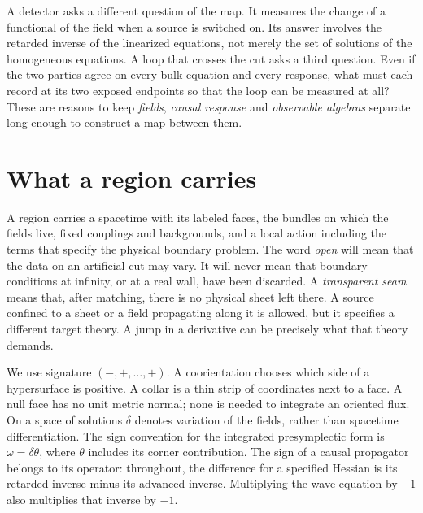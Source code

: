 A detector asks a different question of the map. It measures the change of a functional of the field when a source is switched on. Its answer involves the retarded inverse of the linearized equations, not merely the set of solutions of the homogeneous equations. A loop that crosses the cut asks a third question. Even if the two parties agree on every bulk equation and every response, what must each record at its two exposed endpoints so that the loop can be measured at all? These are reasons to keep \emph{fields}, \emph{causal response} and \emph{observable algebras} separate long enough to construct a map between them.

\section*{What a region carries}
A region carries a spacetime with its labeled faces, the bundles on which the fields live, fixed couplings and backgrounds, and a local action including the terms that specify the physical boundary problem. The word \emph{open} will mean that the data on an artificial cut may vary. It will never mean that boundary conditions at infinity, or at a real wall, have been discarded. A \emph{transparent seam} means that, after matching, there is no physical sheet left there. A source confined to a sheet or a field propagating along it is allowed, but it specifies a different target theory. A jump in a derivative can be precisely what that theory demands.

We use signature $(-,+,\ldots,+)$. A coorientation chooses which side of a hypersurface is positive. A collar is a thin strip of coordinates next to a face. A null face has no unit metric normal; none is needed to integrate an oriented flux. On a space of solutions $\delta$ denotes variation of the fields, rather than spacetime differentiation. The sign convention for the integrated presymplectic form is $\omega=\delta\theta$, where $\theta$ includes its corner contribution. The sign of a causal propagator belongs to its operator: throughout, the difference for a specified Hessian is its retarded inverse minus its advanced inverse. Multiplying the wave equation by $-1$ also multiplies that inverse by $-1$.

